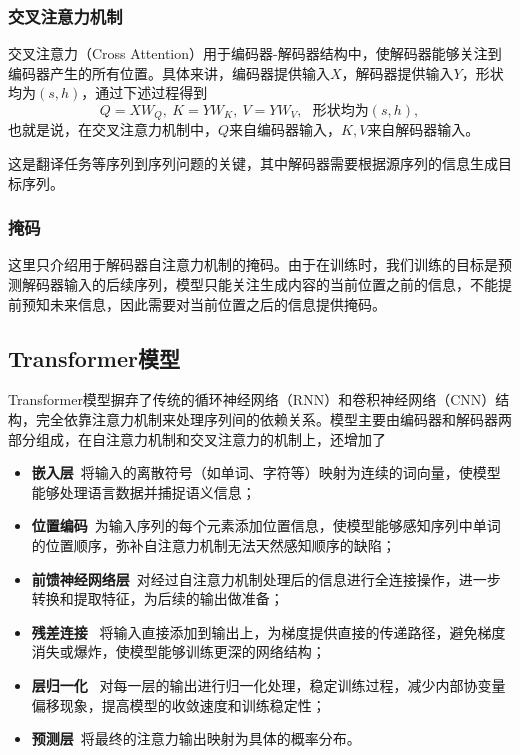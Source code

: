 \subsubsection{交叉注意力机制}
交叉注意力（Cross Attention）用于编码器-解码器结构中，使解码器能够关注到编码器产生的所有位置。具体来讲，编码器提供输入$X$，解码器提供输入$Y$，形状均为$(s,h)$，通过下述过程得到
$$
Q = XW_Q , \ 
K = YW_K , \ 
V = YW_V , \ \ \ \text{形状均为}(s, h),
$$
也就是说，在交叉注意力机制中，$Q$来自编码器输入，$K,V$来自解码器输入。

这是翻译任务等序列到序列问题的关键，其中解码器需要根据源序列的信息生成目标序列。

\subsubsection{掩码}

这里只介绍用于解码器自注意力机制的掩码。由于在训练时，我们训练的目标是预测解码器输入的后续序列，模型只能关注生成内容的当前位置之前的信息，不能提前预知未来信息，因此需要对当前位置之后的信息提供掩码。

\subsection{Transformer模型}

Transformer模型摒弃了传统的循环神经网络（RNN）和卷积神经网络（CNN）结构，完全依靠注意力机制来处理序列间的依赖关系。模型主要由编码器和解码器两部分组成，在自注意力机制和交叉注意力的机制上，还增加了
\begin{itemize}[itemsep=-5pt, leftmargin=4em]
    \item \textbf{嵌入层}\  将输入的离散符号（如单词、字符等）映射为连续的词向量，使模型能够处理语言数据并捕捉语义信息；
    \item \textbf{位置编码}\  为输入序列的每个元素添加位置信息，使模型能够感知序列中单词的位置顺序，弥补自注意力机制无法天然感知顺序的缺陷；
    \item \textbf{前馈神经网络层}\  对经过自注意力机制处理后的信息进行全连接操作，进一步转换和提取特征，为后续的输出做准备；
    \item \textbf{残差连接} \ 将输入直接添加到输出上，为梯度提供直接的传递路径，避免梯度消失或爆炸，使模型能够训练更深的网络结构；
    \item \textbf{层归一化} \ 对每一层的输出进行归一化处理，稳定训练过程，减少内部协变量偏移现象，提高模型的收敛速度和训练稳定性；
    \item \textbf{预测层}\  将最终的注意力输出映射为具体的概率分布。
\end{itemize}

